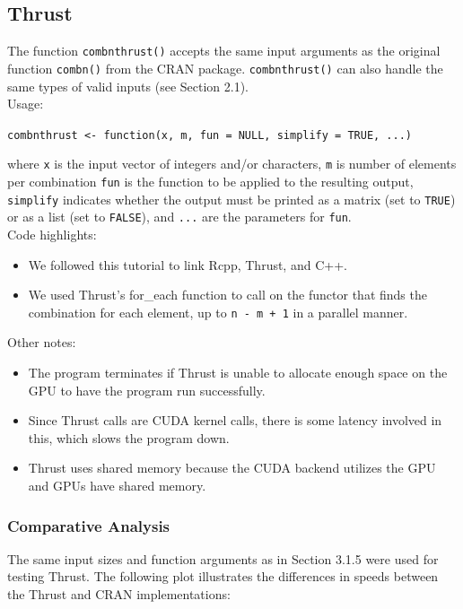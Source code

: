\subsection{Thrust}

The function \texttt{combnthrust()} accepts the same input arguments as the original function \texttt{combn()} from the CRAN package. \texttt{combnthrust()} can also handle the same types of valid inputs (see Section 2.1).\\
\null
Usage:\\
\null

\texttt{combnthrust <- function(x, m, fun = NULL, simplify = TRUE, ...)}\\
\null

where \texttt{x} is the input vector of integers and/or characters, \texttt{m} is number of elements per combination
\texttt{fun} is the function to be applied to the resulting output, \texttt{simplify} indicates whether the output must be printed as a matrix (set to \texttt{TRUE}) or as a list (set to \texttt{FALSE}), and \texttt{...} are the parameters for \texttt{fun}.\\

\null
Code highlights:\\
\begin{itemize}
\item We followed this tutorial \cite{matlofftutorial} to link Rcpp, Thrust, and C++.
\item We used Thrust's  for\_each function to call on the functor that finds the combination for each element, up to \texttt{n - m + 1} in a parallel manner. 
\end{itemize}
Other notes:
\begin{itemize}
\item The program terminates if Thrust is unable to allocate enough space on the GPU to have the program run successfully. 
\item Since Thrust calls are CUDA kernel calls, there is some latency involved in this, which slows the program down. 
\item Thrust uses shared memory because the CUDA backend utilizes the GPU and GPUs have shared memory. 
\end{itemize}


\subsubsection{Comparative Analysis}
The same input sizes and function arguments as in Section 3.1.5 were used for testing Thrust. The following plot illustrates the differences in speeds between the Thrust and CRAN implementations:\\
\null

